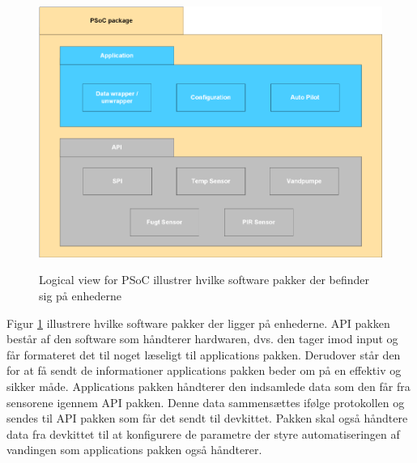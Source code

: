 %
%
%
\newenvironment{figure1}[1][]{\begin{figure}[#1]\vspace{3.0cm}}{\vspace{1.0cm}\end{figure}}
\begin{figure1}[htbp] \centering
{\includegraphics[scale=0.7]{filer/systemarkitektur/logical_view_psoc}}
\caption{Logical view for PSoC illustrer hvilke software pakker der befinder sig på enhederne}
\label{fig:Logical View PSoC}
\end{figure1}

Figur \ref{fig:Logical View PSoC} illustrere hvilke software pakker der ligger på enhederne. API pakken består af den software som håndterer hardwaren, dvs. den tager imod input og får formateret det til noget læseligt til applications pakken. Derudover står den for at få sendt de informationer applications pakken beder om på en effektiv og sikker måde. Applications pakken håndterer den indsamlede data som den får fra sensorene igennem API pakken. Denne data sammensættes ifølge protokollen og sendes til API pakken som får det sendt til devkittet. Pakken skal også håndtere data fra devkittet til at konfigurere de parametre der styre automatiseringen af vandingen som applications pakken også håndterer.

